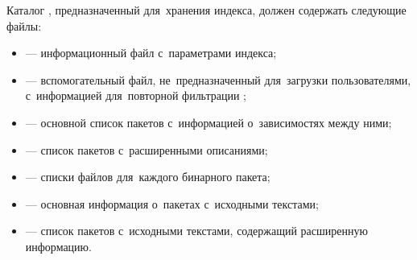 Каталог , предназначенный для~хранения индекса, должен содержать следующие файлы:

\begin{itemize}

\item{ --- информационный файл с~параметрами индекса;}
\item{ --- вспомогательный файл, не~предназначенный для~загрузки пользователями, с~информацией для~повторной фильтрации \provides;}
\item{ --- основной список пакетов с~информацией о~зависимостях между ними;}
\item{ --- список пакетов с~расширенными описаниями;}
\item{ --- списки файлов для~каждого бинарного пакета;}
\item{ --- основная информация о~пакетах с~исходными текстами;}
\item{ --- список пакетов с~исходными текстами, содержащий расширенную информацию.}

\end{itemize}
